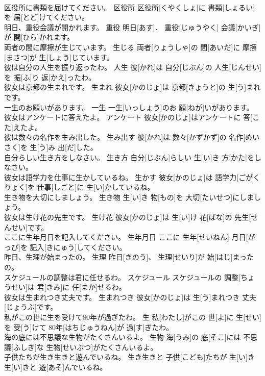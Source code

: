 \documentclass[8pt]{extreport}
\begin{document}
\begin{CJK}{UTF8}{min}
\\	区役所に書類を届けてください。	区役所	区役所[くやくしょ]に 書類[しょるい]を 届[とど]けてください。	
\\	明日、重役会議が開かれます。	重役	明日[あす]、 重役[じゅうやく] 会議[かいぎ]が 開[ひら]かれます。	
\\	両者の間に摩擦が生じています。	生じる	両者[りょうしゃ]の 間[あいだ]に 摩擦[まさつ]が 生[しょう]じています。	
\\	彼は自分の人生を振り返ったわ。	人生	彼[かれ]は 自分[じぶん]の 人生[じんせい]を 振[ふ]り 返[かえ]ったわ。	
\\	彼女は京都の生まれです。	生まれ	彼女[かのじょ]は 京都[きょうと]の 生[う]まれです。	
\\	一生のお願いがあります。	一生	一生[いっしょう]のお 願[ねが]いがあります。	
\\	彼女はアンケートに答えたよ。	アンケート	彼女[かのじょ]はアンケートに 答[こた]えたよ。	
\\	彼は数々の名作を生み出した。	生み出す	彼[かれ]は 数々[かずかず]の 名作[めいさく]を 生[う]み 出[だ]した。	
\\	自分らしい生き方をしなさい。	生き方	自分[じぶん]らしい 生[い]き 方[かた]をしなさい。	
\\	彼女は語学力を仕事に生かしているね。	生かす	彼女[かのじょ]は 語学力[ごがくりょく]を 仕事[しごと]に 生[い]かしているね。	
\\	生き物を大切にしましょう。	生き物	生[い]き 物[もの]を 大切[たいせつ]にしましょう。	
\\	彼女は生け花の先生です。	生け花	彼女[かのじょ]は 生[い]け 花[ばな]の 先生[せんせい]です。	
\\	ここに生年月日を記入してください。	生年月日	ここに 生年[せいねん] 月日[がっぴ]を 記入[きにゅう]してください。	
\\	昨日、生理が始まったの。	生理	昨日[きのう]、 生理[せいり]が 始[はじ]まったの。	
\\	スケジュールの調整は君に任せるわ。	スケジュール	スケジュールの 調整[ちょうせい]は 君[きみ]に 任[まか]せるわ。	
\\	彼女は生まれつき丈夫です。	生まれつき	彼女[かのじょ]は 生[う]まれつき 丈夫[じょうぶ]です。	
\\	私がこの世に生を受けて80年が過ぎたわ。	生	私[わたし]がこの 世[よ]に 生[せい]を 受[う]けて 80年[はちじゅうねん]が 過[す]ぎたわ。	
\\	海の底には不思議な生物がたくさんいるよ。	生物	海[うみ]の 底[そこ]には 不思議[ふしぎ]な 生物[せいぶつ]がたくさんいるよ。	
\\	子供たちが生き生きと遊んでいるね。	生き生きと	子供[こども]たちが 生[い]き 生[い]きと 遊[あそ]んでいるね。	

\end{CJK}
\end{document}
